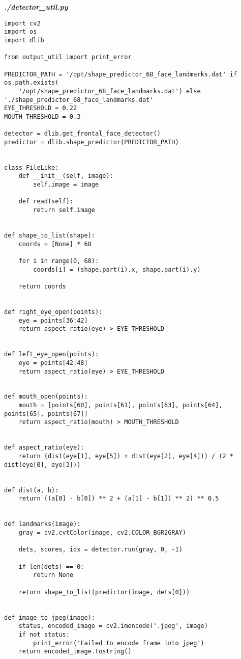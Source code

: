 \textit{\textbf{./detector\_util.py}}
\begin{verbatim}
import cv2
import os
import dlib

from output_util import print_error

PREDICTOR_PATH = '/opt/shape_predictor_68_face_landmarks.dat' if os.path.exists(
    '/opt/shape_predictor_68_face_landmarks.dat') else './shape_predictor_68_face_landmarks.dat'
EYE_THRESHOLD = 0.22
MOUTH_THRESHOLD = 0.3

detector = dlib.get_frontal_face_detector()
predictor = dlib.shape_predictor(PREDICTOR_PATH)


class FileLike:
    def __init__(self, image):
        self.image = image

    def read(self):
        return self.image


def shape_to_list(shape):
    coords = [None] * 68

    for i in range(0, 68):
        coords[i] = (shape.part(i).x, shape.part(i).y)

    return coords


def right_eye_open(points):
    eye = points[36:42]
    return aspect_ratio(eye) > EYE_THRESHOLD


def left_eye_open(points):
    eye = points[42:48]
    return aspect_ratio(eye) > EYE_THRESHOLD


def mouth_open(points):
    mouth = [points[60], points[61], points[63], points[64], points[65], points[67]]
    return aspect_ratio(mouth) > MOUTH_THRESHOLD


def aspect_ratio(eye):
    return (dist(eye[1], eye[5]) + dist(eye[2], eye[4])) / (2 * dist(eye[0], eye[3]))


def dist(a, b):
    return ((a[0] - b[0]) ** 2 + (a[1] - b[1]) ** 2) ** 0.5


def landmarks(image):
    gray = cv2.cvtColor(image, cv2.COLOR_BGR2GRAY)

    dets, scores, idx = detector.run(gray, 0, -1)

    if len(dets) == 0:
        return None

    return shape_to_list(predictor(image, dets[0]))


def image_to_jpeg(image):
    status, encoded_image = cv2.imencode('.jpeg', image)
    if not status:
        print_error('Failed to encode frame into jpeg')
    return encoded_image.tostring()

\end{verbatim}

